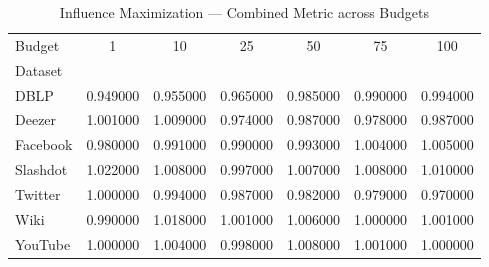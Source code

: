 \begin{table}
\caption{Influence Maximization — Combined Metric across Budgets}
\label{tab:influence_maximization}
\begin{tabular}{lcccccc}
\toprule
Budget & 1 & 10 & 25 & 50 & 75 & 100 \\
Dataset &  &  &  &  &  &  \\
\midrule
DBLP & 0.949000 & 0.955000 & 0.965000 & 0.985000 & 0.990000 & 0.994000 \\
Deezer & 1.001000 & 1.009000 & 0.974000 & 0.987000 & 0.978000 & 0.987000 \\
Facebook & 0.980000 & 0.991000 & 0.990000 & 0.993000 & 1.004000 & 1.005000 \\
Slashdot & 1.022000 & 1.008000 & 0.997000 & 1.007000 & 1.008000 & 1.010000 \\
Twitter & 1.000000 & 0.994000 & 0.987000 & 0.982000 & 0.979000 & 0.970000 \\
Wiki & 0.990000 & 1.018000 & 1.001000 & 1.006000 & 1.000000 & 1.001000 \\
YouTube & 1.000000 & 1.004000 & 0.998000 & 1.008000 & 1.001000 & 1.000000 \\
\bottomrule
\end{tabular}
\end{table}
